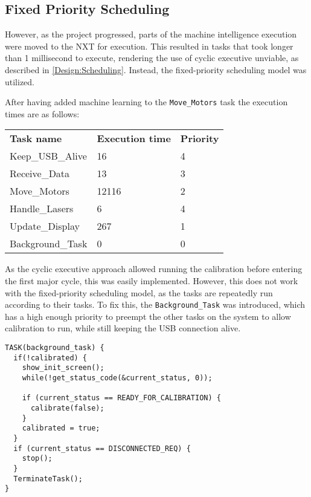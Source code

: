 \subsection{Fixed Priority Scheduling}
However, as the project progressed, parts of the machine intelligence execution were moved to the NXT for execution.
This resulted in tasks that took longer than 1 millisecond to execute, rendering the use of cyclic executive unviable, as described in \autoref{Design:Scheduling}.
Instead, the fixed-priority scheduling model was utilized.

After having added machine learning to the \texttt{Move\_Motors} task the execution times are as follows:

\begin{table}[H]
\begin{tabular}{lll}
\textbf{Task name}  & \textbf{Execution time} 	& \textbf{Priority}\\
Keep\_USB\_Alive    & 16                        & 4   \\
Receive\_Data       & 13                        & 3   \\
Move\_Motors        & 12116                     & 2   \\
Handle\_Lasers      & 6                         & 4   \\
Update\_Display     & 267                       & 1   \\
Background\_Task    & 0                         & 0   
\end{tabular}
\end{table}\label{table:executionTimes}

As the cyclic executive approach allowed running the calibration before entering the first major cycle, this was easily implemented.
However, this does not work with the fixed-priority scheduling model, as the tasks are repeatedly run according to their tasks.
To fix this, the \texttt{Background\_Task} was introduced, which has a high enough priority to preempt the other tasks on the system to allow calibration to run, while still keeping the USB connection alive.

\begin{lstlisting}[language=CSharp,label={lst:backgroundTask},caption={Background task}]
TASK(background_task) {
  if(!calibrated) {
    show_init_screen();
    while(!get_status_code(&current_status, 0));

    if (current_status == READY_FOR_CALIBRATION) {
      calibrate(false);
    }
    calibrated = true;
  }
  if (current_status == DISCONNECTED_REQ) {
    stop();
  }
  TerminateTask();
}
\end{lstlisting}

